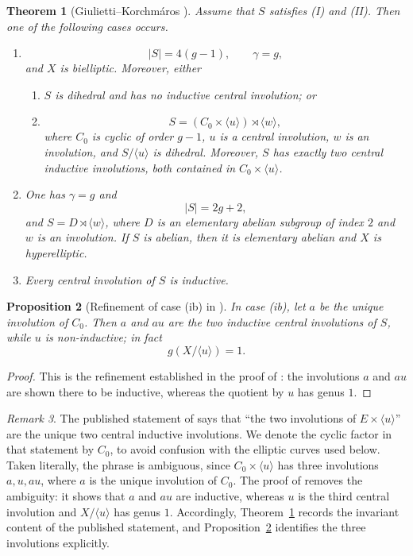 \documentclass[11pt]{article}
\newtheorem{theorem}{Theorem}[section]
\newtheorem{proposition}[theorem]{Proposition}
\theoremstyle{remark}
\newtheorem{remark}[theorem]{Remark}
\begin{document}
\begin{theorem}[Giulietti--Korchm\'aros {\cite[Theorem~1.2]{GK2015}}]
\label{thm:GKclassification}
Assume that $S$ satisfies \textup{(I)} and \textup{(II)}.  Then one of
the following cases occurs.
\begin{enumerate}[label=\textup{(\roman*)}]
\item
\[
        |S|=4(g-1),\qquad \gamma=g,
\]
and $X$ is bielliptic.  Moreover, either
\begin{enumerate}[label=\textup{(i\alph*)}]
\item $S$ is dihedral and has no inductive central involution; or
\item
\[
        S=(C_0\times\langle u\rangle)\rtimes\langle w\rangle,
\]
where $C_0$ is cyclic of order $g-1$, $u$ is a central involution,
$w$ is an involution, and $S/\langle u\rangle$ is dihedral.  Moreover,
$S$ has exactly two central inductive involutions, both contained in
$C_0\times\langle u\rangle$.
\end{enumerate}
\item One has $\gamma=g$ and
\[
        |S|=2g+2,
\]
and $S=D\rtimes\langle w\rangle$, where $D$ is an elementary abelian
subgroup of index $2$ and $w$ is an involution.  If $S$ is abelian,
then it is elementary abelian and $X$ is hyperelliptic.
\item Every central involution of $S$ is inductive.
\end{enumerate}
\end{theorem}

\begin{proposition}[Refinement of case \textup{(ib)} in \cite{GK2015}]
\label{prop:GK-refinement}
In case \textup{(ib)}, let $a$ be the unique involution of $C_0$.
Then $a$ and $au$ are the two inductive central involutions of $S$, while
$u$ is non-inductive; in fact
\[
        g(X/\langle u\rangle)=1.
\]
\end{proposition}

\begin{proof}
This is the refinement established in the proof of
\cite[Theorem~4.3, pp.~277--278]{GK2015}: the involutions $a$ and $au$
are shown there to be inductive, whereas the quotient by $u$ has genus
$1$.
\end{proof}

\begin{remark}\label{rem:GK-reading}
The published statement of \cite[Theorem~1.2(ib)]{GK2015} says that
``the two involutions of $E\times\langle u\rangle$'' are the unique two
central inductive involutions.  We denote the cyclic factor in that
statement by $C_0$, to avoid confusion with the elliptic curves used below.
Taken literally, the phrase is ambiguous, since
$C_0\times\langle u\rangle$ has three involutions $a,u,au$, where $a$ is
the unique involution of $C_0$.  The proof of
\cite[Theorem~4.3, pp.~277--278]{GK2015} removes the ambiguity: it shows
that $a$ and $au$ are inductive, whereas $u$ is the third central
involution and $X/\langle u\rangle$ has genus $1$.  Accordingly,
Theorem~\ref{thm:GKclassification} records the invariant content of the
published statement, and Proposition~\ref{prop:GK-refinement} identifies
the three involutions explicitly.
\end{remark}
\end{document}
